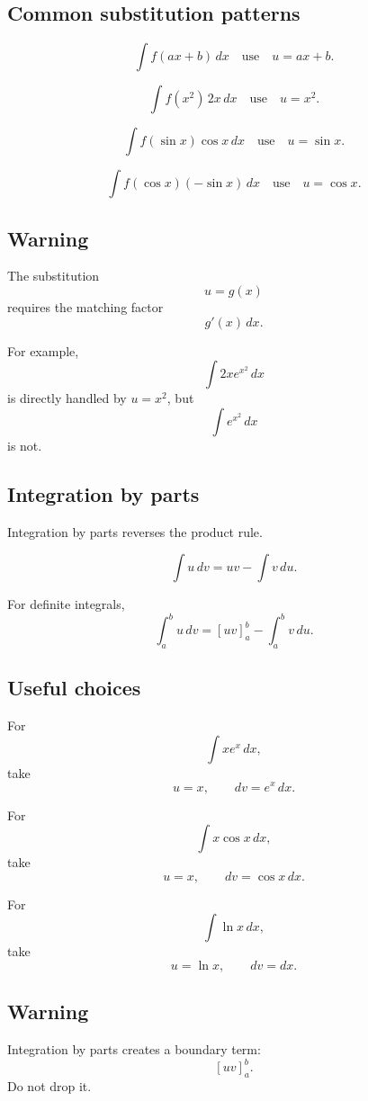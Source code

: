 \subsection*{Common substitution patterns}

\[
\int f(ax+b)\,dx
\quad\text{use}\quad
u=ax+b.
\]

\[
\int f(x^2)\,2x\,dx
\quad\text{use}\quad
u=x^2.
\]

\[
\int f(\sin x)\cos x\,dx
\quad\text{use}\quad
u=\sin x.
\]

\[
\int f(\cos x)(-\sin x)\,dx
\quad\text{use}\quad
u=\cos x.
\]

\subsection*{Warning}

The substitution
\[
    u=g(x)
\]
requires the matching factor
\[
    g'(x)\,dx.
\]

For example,
\[
    \int 2x e^{x^2}\,dx
\]
is directly handled by \(u=x^2\), but
\[
    \int e^{x^2}\,dx
\]
is not.

\subsection*{Integration by parts}

Integration by parts reverses the product rule.

\[
\boxed{
    \int u\,dv=uv-\int v\,du.
}
\]

For definite integrals,
\[
\boxed{
    \int_a^b u\,dv
    =
    \left[uv\right]_a^b-\int_a^b v\,du.
}
\]

\subsection*{Useful choices}

For
\[
    \int x e^x\,dx,
\]
take
\[
    u=x,
    \qquad
    dv=e^x\,dx.
\]

For
\[
    \int x\cos x\,dx,
\]
take
\[
    u=x,
    \qquad
    dv=\cos x\,dx.
\]

For
\[
    \int \ln x\,dx,
\]
take
\[
    u=\ln x,
    \qquad
    dv=dx.
\]

\subsection*{Warning}

Integration by parts creates a boundary term:
\[
    [uv]_a^b.
\]
Do not drop it.

